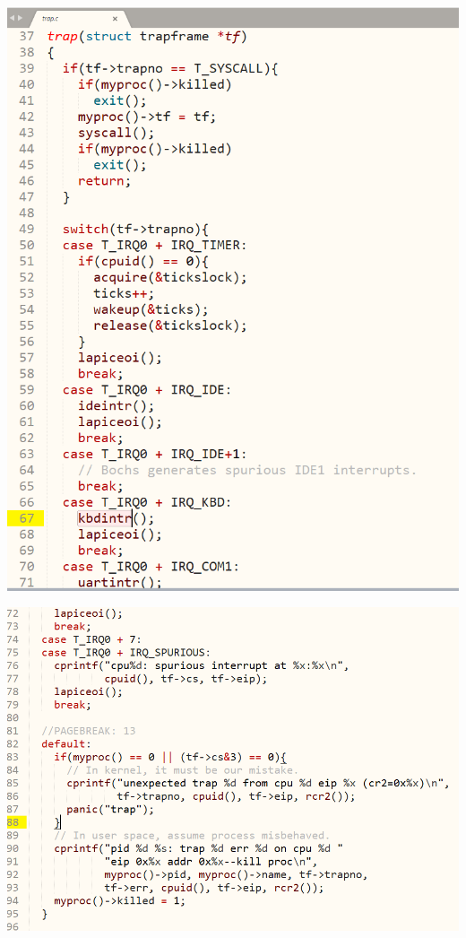   \includegraphics[width=6in]{figures/input/image3.png}

  \includegraphics[width=6in]{figures/input/image4.png}

